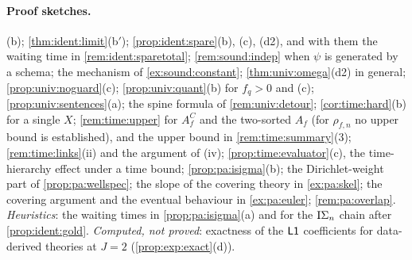 \paragraph{Proof sketches.}
(b);
\cref{thm:ident:limit}(b$'$);
\cref{prop:ident:spare}(b), (c), (d2), and with them the waiting time in \cref{rem:ident:sparetotal};
\cref{rem:sound:indep} when $\psi$ is generated by a schema;
the mechanism of \cref{ex:sound:constant};
\cref{thm:univ:omega}(d2) in general;
\cref{prop:univ:noguard}(c);
\cref{prop:univ:quant}(b) for $f_q>0$ and (c);
\cref{prop:univ:sentences}(a);
the spine formula of \cref{rem:univ:detour};
\cref{cor:time:hard}(b) for a single $X$;
\cref{rem:time:upper} for $A^C_f$ and the two-sorted $A_f$ (for $\rho_{f,n}$ no upper bound is established), and the upper bound in \cref{rem:time:summary}(3);
\cref{rem:time:links}(ii) and the argument of (iv);
\cref{prop:time:evaluator}(c), the time-hierarchy effect under a time bound;
\cref{prop:pa:isigma}(b);
the Dirichlet-weight part of \cref{prop:pa:wellspec};
the slope of the covering theory in \cref{ex:pa:skel};
the covering argument and the eventual behaviour in \cref{ex:pa:euler};
\cref{rem:pa:overlap}.
\emph{Heuristics}: the waiting times in \cref{prop:pa:isigma}(a) and for the $\mathrm{I}\Sigma_{n}$ chain after \cref{prop:ident:gold}.
\emph{Computed, not proved}: exactness of the $\mathord{\mathsf{L1}}$ coefficients for data-derived theories at $J=2$ (\cref{prop:exp:exact}(d)).

